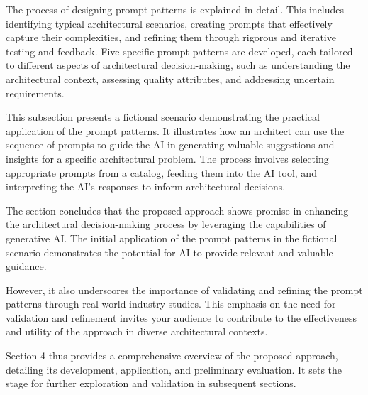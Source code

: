 
The process of designing prompt patterns is explained in detail. This includes identifying typical architectural scenarios, creating prompts that effectively capture their complexities, and refining them through rigorous and iterative testing and feedback. Five specific prompt patterns are developed, each tailored to different aspects of architectural decision-making, such as understanding the architectural context, assessing quality attributes, and addressing uncertain requirements.


This subsection presents a fictional scenario demonstrating the practical application of the prompt patterns. It illustrates how an architect can use the sequence of prompts to guide the AI in generating valuable suggestions and insights for a specific architectural problem. The process involves selecting appropriate prompts from a catalog, feeding them into the AI tool, and interpreting the AI's responses to inform architectural decisions.

The section concludes that the proposed approach shows promise in enhancing the architectural decision-making process by leveraging the capabilities of generative AI. The initial application of the prompt patterns in the fictional scenario demonstrates the potential for AI to provide relevant and valuable guidance. 

However, it also underscores the importance of validating and refining the prompt patterns through real-world industry studies. This emphasis on the need for validation and refinement invites your audience to contribute to the effectiveness and utility of the approach in diverse architectural contexts.

Section 4 thus provides a comprehensive overview of the proposed approach, detailing its development, application, and preliminary evaluation. It sets the stage for further exploration and validation in subsequent sections.
